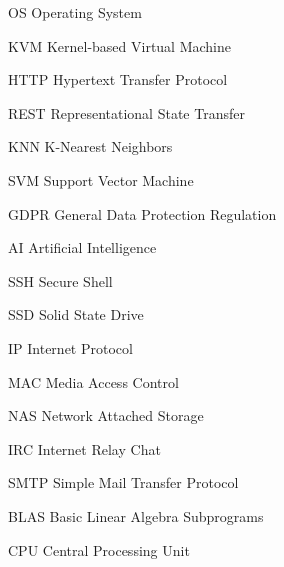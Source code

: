 \begin{abbrv}
    \item[OS]           Operating System
    \item[KVM]          Kernel-based Virtual Machine
    \item[HTTP]         Hypertext Transfer Protocol
    \item[REST]         Representational State Transfer
    \item[KNN]          K-Nearest Neighbors
    \item[SVM]          Support Vector Machine
    \item[GDPR]         General Data Protection Regulation
    \item[AI]           Artificial Intelligence
    \item[SSH]          Secure Shell
    \item[SSD]          Solid State Drive
    \item[IP]           Internet Protocol
    \item[MAC]          Media Access Control
    \item[NAS]          Network Attached Storage
    \item[IRC]          Internet Relay Chat
    \item[SMTP]         Simple Mail Transfer Protocol
    \item[BLAS]         Basic Linear Algebra Subprograms
    \item[CPU]          Central Processing Unit
\end{abbrv}